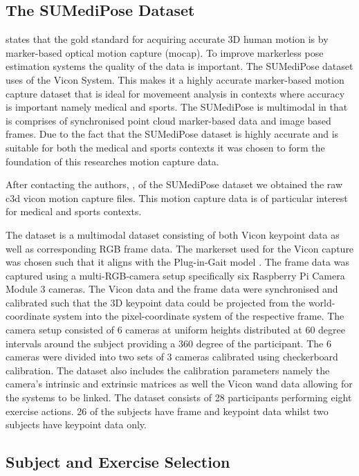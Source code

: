 \subsection{The SUMediPose Dataset}

\citet{ghorbani2021soma} states that the gold standard for acquiring accurate 3D human motion is by marker-based optical motion capture (mocap). 
To improve markerless pose estimation systems the quality of the data is important. The SUMediPose dataset uses of the Vicon System. This makes it a highly accurate marker-based motion capture dataset that is ideal for movemeent analysis in contexts where accuracy is important namely medical and sports. \cite{schreuder2025sumedipose}
The SUMediPose is multimodal in that is comprises of synchronised point cloud marker-based data and image based frames.  
Due to the fact that the SUMediPose dataset is highly accurate and is suitable for both the medical and sports contexts it was chosen to form the foundation of this researches motion capture data. 

After contacting the authors, \citet{schreuder2025sumedipose}, of the SUMediPose dataset we obtained the raw c3d vicon motion capture files. This motion capture data is of particular interest for medical and sports contexts. 

The dataset is a multimodal dataset consisting of both Vicon keypoint data as well as corresponding RGB frame data. The markerset used for the Vicon capture was chosen such that it aligns with the Plug-in-Gait model \cite{davis1991gait}.
The frame data was captured using a multi-RGB-camera setup specifically six Raspberry Pi Camera Module 3 cameras.
The Vicon data and the frame data were synchronised and calibrated such that the 3D keypoint data could be projected from the world-coordinate system into the pixel-coordinate system of the respective frame.
The camera setup consisted of 6 cameras at uniform heights distributed at 60 degree intervals around the subject providing a 360 degree of the participant. The 6 cameras were divided into two sets of 3 cameras calibrated using checkerboard calibration.
The dataset also includes the calibration parameters namely the camera's intrinsic and extrinsic matrices as well the Vicon wand data allowing for the systems to be linked. 
The dataset consists of 28 participants performing eight exercise actions. 26 of the subjects have frame and keypoint data whilst two subjects have keypoint data only.
\subsection{Subject and Exercise Selection}

